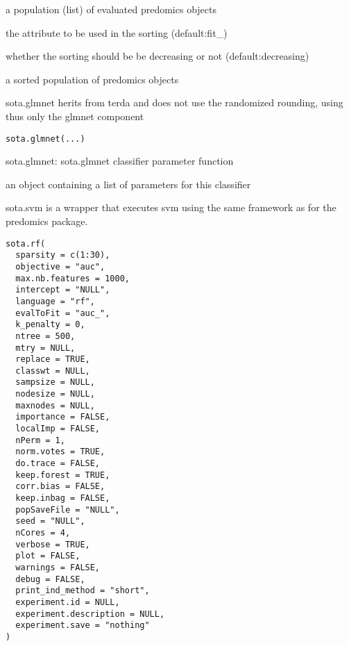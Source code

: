 \documentclass[a4paper]{book}
\begin{document}
%
\begin{Arguments}
\begin{ldescription}
\item[\code{pop:}] a population (list) of evaluated predomics objects

\item[\code{evalToOrder:}] the attribute to be used in the sorting (default:fit\_)

\item[\code{decreasing:}] whether the sorting should be be decreasing or not (default:decreasing)
\end{ldescription}
\end{Arguments}
%
\begin{Value}
a sorted population of predomics objects
\end{Value}
%
\begin{Description}
sota.glmnet herits from terda and does not use the randomized rounding, using thus only the glmnet component
\end{Description}
%
\begin{Usage}
\begin{verbatim}
sota.glmnet(...)
\end{verbatim}
\end{Usage}
%
\begin{Details}
sota.glmnet: sota.glmnet classifier parameter function
\end{Details}
%
\begin{Value}
an object containing a list of parameters for this classifier
\end{Value}
%
\begin{Description}
sota.svm is a wrapper that executes svm using the same framework as for the predomics package.
\end{Description}
%
\begin{Usage}
\begin{verbatim}
sota.rf(
  sparsity = c(1:30),
  objective = "auc",
  max.nb.features = 1000,
  intercept = "NULL",
  language = "rf",
  evalToFit = "auc_",
  k_penalty = 0,
  ntree = 500,
  mtry = NULL,
  replace = TRUE,
  classwt = NULL,
  sampsize = NULL,
  nodesize = NULL,
  maxnodes = NULL,
  importance = FALSE,
  localImp = FALSE,
  nPerm = 1,
  norm.votes = TRUE,
  do.trace = FALSE,
  keep.forest = TRUE,
  corr.bias = FALSE,
  keep.inbag = FALSE,
  popSaveFile = "NULL",
  seed = "NULL",
  nCores = 4,
  verbose = TRUE,
  plot = FALSE,
  warnings = FALSE,
  debug = FALSE,
  print_ind_method = "short",
  experiment.id = NULL,
  experiment.description = NULL,
  experiment.save = "nothing"
)
\end{verbatim}
\end{Usage}
\end{document}
